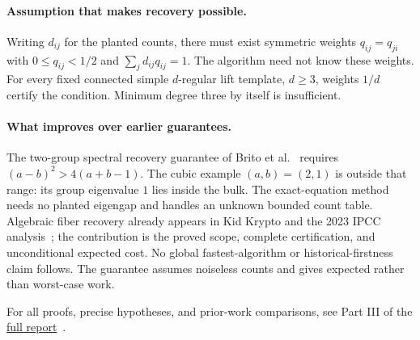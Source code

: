 \documentclass[11pt,letterpaper]{article}
\theoremstyle{definition}
\theoremstyle{remark}
\begin{document}
\paragraph{Assumption that makes recovery possible.}
Writing $d_{ij}$ for the planted counts, there must exist symmetric weights
$q_{ij}=q_{ji}$ with $0\le q_{ij}<1/2$ and $\sum_jd_{ij}q_{ij}=1$.
The algorithm need not know these weights. For every fixed connected simple
$d$-regular lift template, $d\ge3$, weights $1/d$ certify the condition.
Minimum degree three by itself is insufficient.

\paragraph{What improves over earlier guarantees.}
The two-group spectral recovery guarantee of Brito et al.~\cite{RecoveryPrior}
requires $(a-b)^2>4(a+b-1)$. The cubic example $(a,b)=(2,1)$ is outside
that range: its group eigenvalue $1$ lies inside the bulk. The exact-equation
method needs no planted eigengap and handles an unknown bounded count table.
Algebraic fiber recovery already appears in Kid Krypto and the 2023 IPCC
analysis~\cite{AlgebraPrior}; the contribution is the proved scope, complete
certification, and unconditional expected cost. No global fastest-algorithm
or historical-firstness claim follows. The guarantee assumes noiseless
counts and gives expected rather than worst-case work.

For all proofs, precise hypotheses, and prior-work comparisons, see
Part III of the \href{report-long.pdf}{full report}~\cite{FullReport}.
\end{document}
